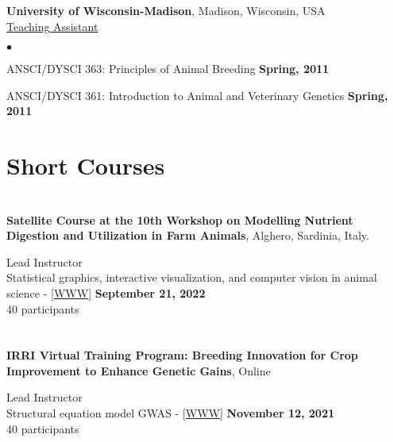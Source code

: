 \documentclass[margin,line,10pt]{res}
\newenvironment{list2}{
  \begin{list}{$\bullet$}{%
      \setlength{\itemsep}{0in}
      \setlength{\parsep}{0in} \setlength{\parskip}{0in}
      \setlength{\topsep}{0in} \setlength{\partopsep}{0in} 
      \setlength{\leftmargin}{0.2in}}}{\end{list}}
\begin{document}
\begin{resume}
 
{\bf University of Wisconsin-Madison}, Madison, Wisconsin, USA  \vspace{0.2cm}  \\
\underline{Teaching Assistant} 
 \vspace{0.4cm}
\begin{list2}
\item ANSCI/DYSCI 363: Principles of Animal Breeding    \hfill {\bf Spring, 2011}

\vspace{0.5cm}

\item ANSCI/DYSCI 361: Introduction to Animal and Veterinary Genetics    \hfill {\bf Spring, 2011} 

  \end{list2}



\vspace{0.5cm}
\section{\sc Short Courses}
\vspace{1cm}




\section{}


{\bf Satellite Course at the 10th Workshop on Modelling Nutrient Digestion and Utilization in Farm Animals}, Alghero, Sardinia, Italy. 
\vspace{.01pt}

Lead Instructor  \\
Statistical graphics, interactive visualization, and computer vision in animal science - [\textcolor{blue}{\href{http://morotalab.org/MODNUT2022/MODNUT2022.html}{WWW}}] 
 \hfill {\bf September 21, 2022}  \\
40 participants



\section{}


{\bf IRRI Virtual Training Program: Breeding Innovation for Crop Improvement to Enhance Genetic Gains}, Online
\vspace{.01pt}

Lead Instructor  \\
Structural equation model GWAS - [\textcolor{blue}{\href{http://morotalab.org/IRRI2021/day1/day1.html}{WWW}}]
\hfill {\bf November 12, 2021} \\
40 participants




\end{resume}
\end{document}
